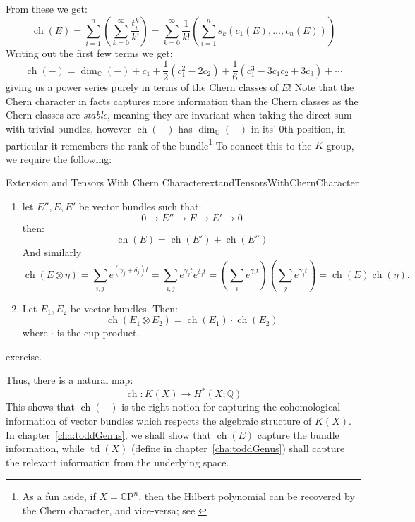 \documentclass{book}
\newenvironment{Proof}[1][]
  {\begin{ProofTcb}[#1]}
  {\end{ProofTcb}}
\newcommand{\Q}{{\mathbb{Q}}}
\newcommand{\C}{{\mathbb{C}}}
\newcommand{\CP}{{\mathbb{C}\mathrm{P}}}
\newcommand{\ch}{{\operatorname{ch}}}
\newcommand{\td}{{\operatorname{td}}}
\renewcommand{\ch}{{\operatorname{ch}}}
\begin{document}
From these we get:
\[
\ch(E) = \sum_{i=1}^n \left(\sum_{k=0}^{\infty} \frac{t_i^k}{k!}\right) = \sum_{k=0}^{\infty}
\frac{1}{k!}\left(\sum_{i=1}^n s_k(c_1(E), ..., c_n(E))\right)
\]
Writing out the first few terms we get:
\[
  \ch(-) = \dim_\C(-) + c_1 + \frac{1}{2}(c_1^2 - 2c_2) + \frac{1}{6}(c_1^3 - 3c_1c_2 + 3c_3) + \cdots
\]
giving us a power series purely in terms of the Chern classes of $E$! Note that the Chern character in facts
captures more information than the Chern classes as the Chern classes are \emph{stable}, meaning they are
invariant when taking the direct sum with trivial bundles, however $\ch(-)$ has $\dim_\C(-)$ in its' $0$th
position, in particular it remembers the rank of the bundle\footnote{As a fun aside, if $X = \CP^n$, then the
Hilbert polynomial can be recovered by the Chern character, and vice-versa; see \cite{chanCorresondenceHilbertPolynomial2004}} To connect this to the $K$-group, we
require the following:

\begin{prop}{Extension and Tensors With Chern Character}{extandTensorsWithChernCharacter}
  \begin{enumerate}
    \item let $E'', E, E'$ be vector bundles such that:
  \[
    0 \to E'' \to E \to E' \to 0
  \]
  then:
  \[
    \ch(E) = \ch(E') + \ch(E'')
  \]
  And similarly
  \[
      \operatorname{ch}(E \otimes \eta) = \sum_{i,j} e^{(\gamma_j+\delta_j)t} = \sum_{i,j} e^{\gamma_j t}e^{\delta_j t} = \left(\sum_i e^{\gamma_j t}\right)\left(\sum_j e^{\gamma_j t}\right) = \operatorname{ch}(E)\operatorname{ch}(\eta).
  \]
    \item Let $E_1, E_2$ be vector bundles. Then:
      \[
        \ch(E_1\otimes E_2) = \ch(E_1)\cdot \ch(E_2)
    \]
    where $\cdot$ is the cup product.
  \end{enumerate}
\end{prop}

\begin{Proof}
  exercise.
\end{Proof}

 Thus, there is a natural map:
\[
  \ch: K(X) \to H^*(X; \Q)
\]
This shows that $\ch(-)$ is the right notion for capturing the cohomological information of vector bundles which
respects the algebraic structure of $K(X)$. In chapter~\ref{cha:toddGenus}, we shall show that $\ch(E)$
capture the bundle information, while $\td(X)$ (define in chapter~\ref{cha:toddGenus}) shall capture the
relevant information from the underlying space.
\end{document}
